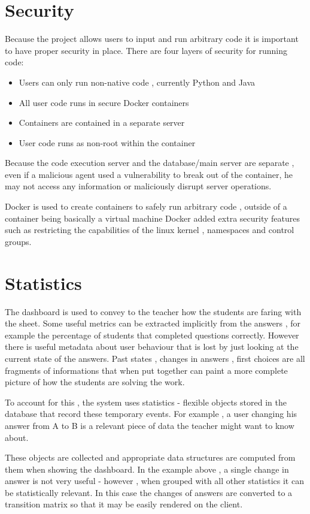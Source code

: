 \section{Security}
Because the project allows users to input and run arbitrary code it is important to have proper security in place. There are four layers of security for running code:
\begin{itemize}
\item Users can only run non-native code , currently Python and Java
\item 	All user code runs in secure Docker containers
\item	Containers are contained in a separate server
\item User code runs as non-root within the container
\end{itemize}
Because the code execution server and the database/main server are separate , even if a malicious agent used a vulnerability to break out of the container, he may not access any information or maliciously disrupt server operations.

Docker is used to create containers to safely run arbitrary code , outside of a container being basically a virtual machine Docker added extra security features \cite{dockersecurity} such as restricting the capabilities of the linux kernel , namespaces and control groups.

\section{Statistics}
The dashboard is used to convey to the teacher how the students are faring with the sheet. Some useful metrics can be extracted implicitly from the answers , for example the percentage of students that completed questions correctly. However there is useful metadata about user behaviour that is lost by just looking at the current state of the answers. Past states , changes in answers , first choices are all fragments of informations that when put together can paint a more complete picture of how the students are solving the work.

To account for this , the system uses statistics - flexible objects stored in the database that record these temporary events. For example , a user changing his answer from A to B is a relevant piece of data the teacher might want to know about.

These objects are collected and appropriate data structures are computed from them when showing the dashboard. In the example above , a single change in answer is not very useful - however , when grouped with all other statistics it can be statistically relevant. In this case the changes of answers are converted to a transition matrix so that it may be easily rendered on the client.

